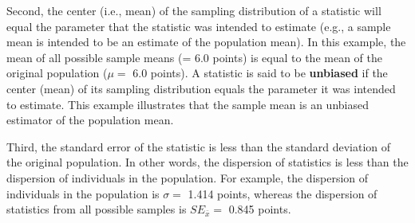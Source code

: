 \documentclass[10pt,openany]{book}\usepackage[]{graphicx}\usepackage[]{color}
\begin{document}
Second, the center (i.e., mean) of the sampling distribution of a statistic will equal the parameter that the statistic was intended to estimate (e.g., a sample mean is intended to be an estimate of the population mean). In this example, the mean of all possible sample means (= 6.0 points) is equal to the mean of the original population ($\mu=$ 6.0 points).  A statistic is said to be \textbf{unbiased} if the center (mean) of its sampling distribution equals the parameter it was intended to estimate.  This example illustrates that the sample mean is an unbiased estimator of the population mean.


\vspace{-12pt}

Third, the standard error of the statistic is less than the standard deviation of the original population.  In other words, the dispersion of statistics is less than the dispersion of individuals in the population.  For example, the dispersion of individuals in the population is $\sigma=$ 1.414 points, whereas the dispersion of statistics from all possible samples is $SE_{\bar{x}}=$ 0.845 points.


\vspace{-12pt}

\vspace{-12pt}
\end{document}
